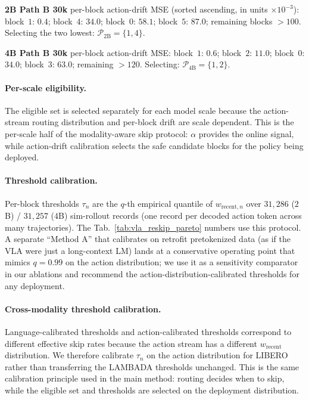 \documentclass{article}
\begin{document}
\textbf{2B Path B 30k} per-block action-drift MSE (sorted ascending, in units $\times 10^{-3}$):
block~$1$: $0.4$; block~$4$: $34.0$; block~$0$: $58.1$; block~$5$: $87.0$; remaining blocks $>$$100$. Selecting the two lowest: $\mathcal{P}_{2\text{B}}=\{1, 4\}$.

\textbf{4B Path B 30k} per-block action-drift MSE: block~$1$: $0.6$; block~$2$: $11.0$; block~$0$: $34.0$; block~$3$: $63.0$; remaining $>$$120$. Selecting: $\mathcal{P}_{4\text{B}}=\{1, 2\}$.

\paragraph{Per-scale eligibility.} The eligible set is selected separately for each model scale because the action-stream routing distribution and per-block drift are scale dependent. This is the per-scale half of the modality-aware skip protocol: $\alpha$ provides the online signal, while action-drift calibration selects the safe candidate blocks for the policy being deployed.

\paragraph{Threshold calibration.} Per-block thresholds $\tau_n$ are the $q$-th empirical quantile of $w_{\text{recent},n}$ over $31{,}286$ ($2$B) / $31{,}257$ ($4$B) sim-rollout records (one record per decoded action token across many trajectories). The Tab.~\ref{tab:vla_reskip_pareto} numbers use this protocol. A separate ``Method A'' that calibrates on retrofit pretokenized data (as if the VLA were just a long-context LM) lands at a conservative operating point that mimics $q{=}0.99$ on the action distribution; we use it as a sensitivity comparator in our ablations and recommend the action-distribution-calibrated thresholds for any deployment.

\paragraph{Cross-modality threshold calibration.} Language-calibrated thresholds and action-calibrated thresholds correspond to different effective skip rates because the action stream has a different $w_{\text{recent}}$ distribution. We therefore calibrate $\tau_n$ on the action distribution for LIBERO rather than transferring the LAMBADA thresholds unchanged. This is the same calibration principle used in the main method: routing decides when to skip, while the eligible set and thresholds are selected on the deployment distribution.
\end{document}
